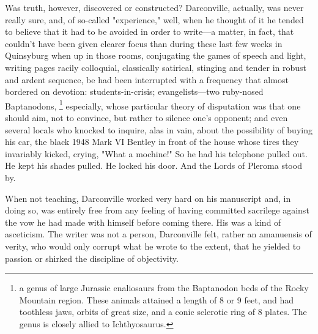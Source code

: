   Was truth, however, discovered or constructed? Darconville, actually, was
never really sure, and, of so-called "experience," well, when he thought of it
he tended to believe that it had to be avoided in order to write---a matter, in
fact, that couldn't have been given clearer focus than during these last few
weeks in Quinsyburg when up in those rooms, conjugating the games of speech and
light, writing pages racily colloquial, classically satirical, stinging and
tender in robust and ardent sequence, be had been interrupted with a frequency
that almost bordered on devotion: students-in-crisis; evangelists---two ruby-nosed
Baptanodons, 
\footnote{ a genus of large Jurassic enaliosaurs from the Baptanodon beds of the
Rocky Mountain region. These animals attained a length of 8 or 9 feet, and had
toothless jaws, orbits of great size, and a conic sclerotic ring of 8 plates.
The genus is closely allied to Ichthyosaurus.
}
especially, whose particular theory of disputation was that one
should aim, not to convince, but rather to silence one's opponent; and even
several locals who knocked to inquire, alas in vain, about the possibility of
buying his car, the black 1948 Mark VI Bentley in front of the house whose tires
they invariably kicked, crying, "What a mochine!" So he had his telephone pulled
out. He kept his shades pulled. He locked his door. And the Lords of Pleroma
stood by.

  When not teaching, Darconville worked very hard on his manuscript and, in
doing so, was entirely free from any feeling of having committed sacrilege
against the vow he had made with himself before coming there. His was a kind of
asceticism. 
The writer was not a person, Darconville felt, rather an amanuensis
of verity, 
who would only corrupt what he wrote to the extent, that he yielded
to passion or shirked 
the discipline of objectivity.

